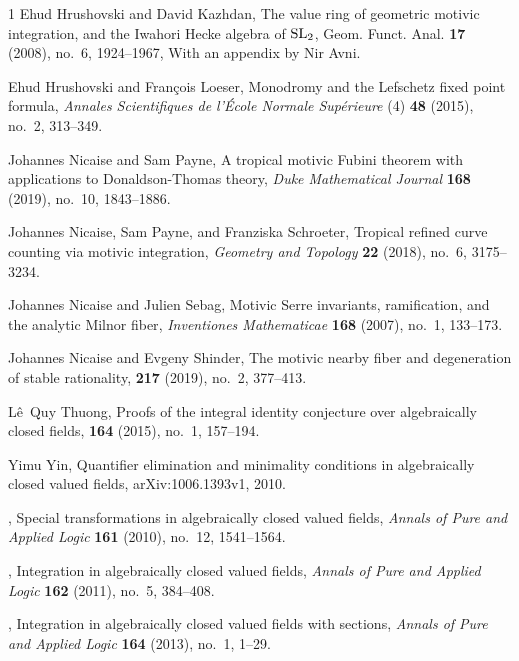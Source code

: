 \documentclass[12pt]{amsart}
\theoremstyle{plain}
\theoremstyle{definition}
\theoremstyle{remark}
\numberwithin{equation}{section}
\theoremstyle{plain}
\newcommand{\0}{\emptyset}
\begin{document}
\begin{thebibliography}{1}
Ehud Hrushovski and David Kazhdan, {The value ring of geometric motivic integration, and the
  {I}wahori {H}ecke algebra of {${\rm SL}_2$}}, Geom. Funct. Anal. \textbf{17} (2008),
  no.~6, 1924--1967, With an appendix by Nir Avni.

Ehud Hrushovski and Fran{\c{c}}ois Loeser, {Monodromy and the {L}efschetz
  fixed point formula}, {\em Annales Scientifiques de l'\'Ecole Normale Sup\'erieure} (4) \textbf{48} (2015),
  no.~2, 313--349.


Johannes Nicaise and Sam Payne, {A tropical motivic {F}ubini theorem with
  applications to {D}onaldson-{T}homas theory}, {\em Duke Mathematical Journal} \textbf{168} (2019), no.~10, 1843–1886.

Johannes Nicaise, Sam Payne, and Franziska Schroeter,
{Tropical refined curve counting via motivic integration}, {\em Geometry and Topology} \textbf{22} (2018),  no.~6, 3175--3234.

Johannes Nicaise and Julien Sebag,
{Motivic Serre invariants, ramification, and the analytic Milnor fiber}, {\em Inventiones Mathematicae} \textbf{168}  (2007), no.~1, 133--173.

Johannes Nicaise and Evgeny Shinder,
\newblock The motivic nearby fiber and degeneration of stable rationality,
 \textbf{217} (2019), no.~2, 377--413.


L{\^e}~Quy Thuong,
\newblock Proofs of the integral identity conjecture over algebraically closed
  fields,
 \textbf{164} (2015), no.~1, 157--194.

Yimu Yin, {Quantifier elimination and minimality conditions in
  algebraically closed valued fields}, arXiv:1006.1393v1, 2010.


\bysame, {Special transformations in algebraically closed valued fields},
  {\em Annals of Pure and Applied Logic} \textbf{161} (2010), no.~12, 1541--1564.

\bysame, {Integration in algebraically closed valued fields}, {\em Annals of
  Pure and Applied Logic} \textbf{162} (2011), no.~5, 384--408.

\bysame, {Integration in algebraically closed valued fields with
  sections}, {\em Annals of Pure and Applied Logic} \textbf{164} (2013), no.~1,
  1--29.


\end{thebibliography}
\end{document}
